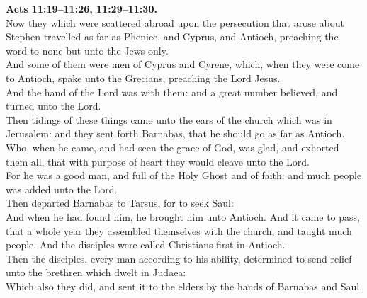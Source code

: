 \documentclass[10pt]{article} %
\begin{document}
{\begin{minipage}[t]{0.45\textwidth}
\textbf{Acts 11:19--11:26, 11:29--11:30.}\\
Now they which were scattered abroad upon the persecution that arose about Stephen travelled as far as Phenice, and Cyprus, and Antioch, preaching the word to none but unto the Jews only.\\
And some of them were men of Cyprus and Cyrene, which, when they were come to Antioch, spake unto the Grecians, preaching the Lord Jesus.\\
And the hand of the Lord was with them: and a great number believed, and turned unto the Lord.\\
Then tidings of these things came unto the ears of the church which was in Jerusalem: and they sent forth Barnabas, that he should go as far as Antioch.\\
Who, when he came, and had seen the grace of God, was glad, and exhorted them all, that with purpose of heart they would cleave unto the Lord.\\
For he was a good man, and full of the Holy Ghost and of faith: and much people was added unto the Lord.\\
Then departed Barnabas to Tarsus, for to seek Saul:\\
And when he had found him, he brought him unto Antioch. And it came to pass, that a whole year they assembled themselves with the church, and taught much people. And the disciples were called Christians first in Antioch.\\
Then the disciples, every man according to his ability, determined to send relief unto the brethren which dwelt in Judaea:\\
Which also they did, and sent it to the elders by the hands of Barnabas and Saul.\\

\end{minipage}}
\vspace*{\fill}
\newpage
\Huge%
\vspace*{\fill}
\end{document}
